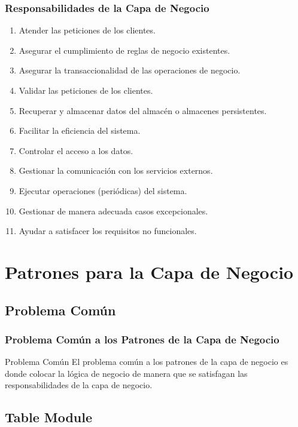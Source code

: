 \documentclass[handout,a4paper,slidestop,xcolor=pst,blue]{beamer}
\begin{document}
\begin{frame}[c]
	\frametitle{Responsabilidades de la Capa de Negocio}
	\begin{enumerate}[<+->]
        \item Atender las peticiones de los clientes.
        \item Asegurar el cumplimiento de \alert{reglas de negocio} existentes.
        \item Asegurar la \alert{transaccionalidad} de las operaciones de negocio.
        \item Validar las peticiones de los clientes.
        \item Recuperar y almacenar datos del almacén o almacenes persistentes.
        \item Facilitar la eficiencia del sistema.
        \item Controlar el acceso a los datos.
        \item Gestionar la comunicación con los servicios externos.
        \item Ejecutar operaciones (periódicas) del sistema.
        \item Gestionar de manera adecuada casos excepcionales.
        \item Ayudar a satisfacer los requisitos no funcionales.
	\end{enumerate}
\end{frame}

\section{Patrones para la Capa de Negocio}

\subsection{Problema Común}

\begin{frame}[c]
    \frametitle{Problema Común a los Patrones de la Capa de Negocio}
    \begin{block}{Problema Común}
        El problema común a los patrones de la capa de negocio es donde colocar la
        lógica de negocio de manera que se satisfagan las responsabilidades de la capa de negocio.
    \end{block}
\end{frame}

\subsection{Table Module}
\end{document}
